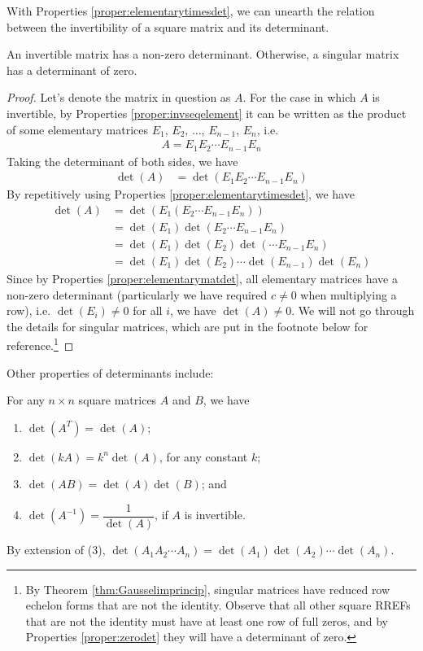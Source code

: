 With Properties \ref{proper:elementarytimesdet}, we can unearth the relation between the invertibility of a square matrix and its determinant.
\begin{proper}
\label{proper:invnonzerodet}
An invertible matrix has a non-zero determinant. Otherwise, a singular matrix has a determinant of zero.
\end{proper}
\begin{proof}
Let's denote the matrix in question as $A$. For the case in which $A$ is invertible, by Properties \ref{proper:invseqelement} it can be written as the product of some elementary matrices $E_1$, $E_2$, $\ldots$, $E_{n-1}$, $E_n$, i.e.\
\begin{align*}
A = E_{1}E_{2} \cdots E_{n-1}E_n
\end{align*}
Taking the determinant of both sides, we have
\begin{align*}
\det(A) &= \det(E_{1}E_{2} \cdots E_{n-1}E_n)
\end{align*}
By repetitively using Properties \ref{proper:elementarytimesdet}, we have
\begin{align*}
\det(A) &= \det(E_{1}(E_{2} \cdots E_{n-1}E_n)) \\
&= \det(E_1) \det(E_{2} \cdots E_{n-1}E_n) \\
&= \det(E_1) \det(E_{2}) \det(\cdots E_{n-1}E_n) \\
&= \det(E_1) \det(E_{2}) \cdots \det(E_{n-1})\det(E_n)
\end{align*}
Since by Properties \ref{proper:elementarymatdet}, all elementary matrices have a non-zero determinant (particularly we have required $c \neq 0$ when multiplying a row), i.e. $\det(E_i) \neq 0$ for all $i$, we have $\det(A) \neq 0$. We will not go through the details for singular matrices, which are put in the footnote below for reference.\footnote{By Theorem \ref{thm:Gausselimprincip}, singular matrices have reduced row echelon forms that are not the identity. Observe that all other square RREFs that are not the identity must have at least one row of full zeros, and by Properties \ref{proper:zerodet} they will have a determinant of zero.} 
\end{proof}
Other properties of determinants include:
\begin{proper}
\label{proper:properdet}
For any $n \times n$ square matrices $A$ and $B$, we have
\begin{enumerate}
\item $\det(A^T) = \det(A)$;
\item $\det(kA) = k^n \det(A)$, for any constant $k$;
\item $\det(AB) = \det(A)\det(B)$; and
\item $\det(A^{-1}) = \dfrac{1}{\det(A)}$, if $A$ is invertible.
\end{enumerate}
By extension of (3), $\det(A_1A_2\cdots A_n) = \det(A_1)\det(A_2)\cdots\det(A_n)$.
\end{proper}
